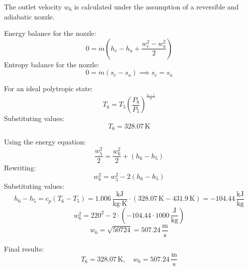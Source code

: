The outlet velocity \( w_6 \) is calculated under the assumption of a reversible and adiabatic nozzle.  

Energy balance for the nozzle:  
\[
0 = \dot{m} \left( h_e - h_a + \frac{w_e^2 - w_a^2}{2} \right)
\]  
Entropy balance for the nozzle:  
\[
0 = \dot{m} \left( s_e - s_a \right) \implies s_e = s_a
\]  

For an ideal polytropic state:  
\[
T_6 = T_5 \left( \frac{P_6}{P_5} \right)^{\frac{n-1}{n}}
\]  
Substituting values:  
\[
T_6 = 328.07 \, \text{K}
\]  

Using the energy equation:  
\[
\frac{w_5^2}{2} = \frac{w_6^2}{2} + (h_6 - h_5)
\]  
Rewriting:  
\[
w_6^2 = w_5^2 - 2(h_6 - h_5)
\]  
Substituting values:  
\[
h_6 - h_5 = c_p (T_6 - T_5) = 1.006 \, \frac{\text{kJ}}{\text{kg·K}} \cdot (328.07 \, \text{K} - 431.9 \, \text{K}) = -104.44 \, \frac{\text{kJ}}{\text{kg}}
\]  
\[
w_6^2 = 220^2 - 2 \cdot (-104.44 \cdot 1000 \, \frac{\text{J}}{\text{kg}})
\]  
\[
w_6 = \sqrt{50724} = 507.24 \, \frac{\text{m}}{\text{s}}
\]  

Final results:  
\[
T_6 = 328.07 \, \text{K}, \quad w_6 = 507.24 \, \frac{\text{m}}{\text{s}}
\]